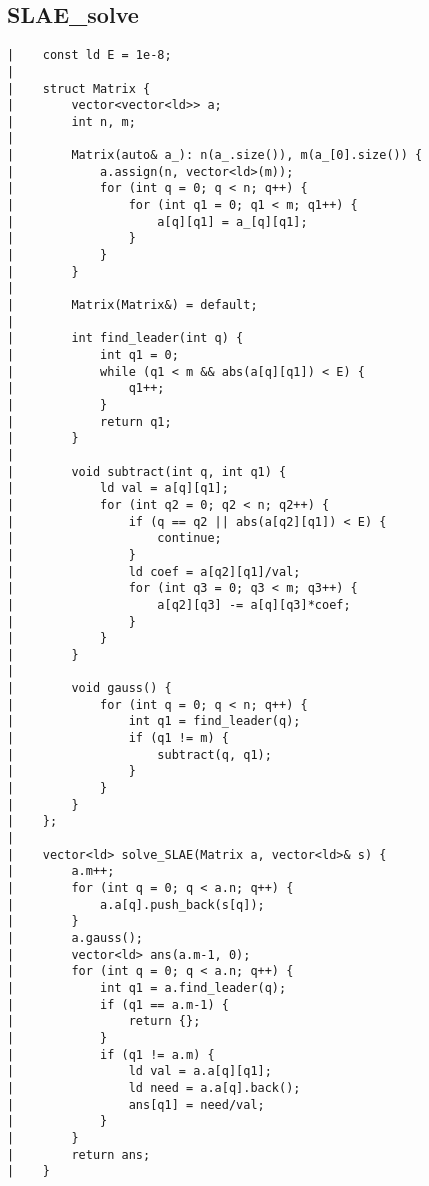 \documentclass[a4paper, 10pt]{article}
\begin{document}
\begin{center}
\section*{SLAE\_solve}
\begin{verbatim}
|    const ld E = 1e-8;
|    
|    struct Matrix {
|        vector<vector<ld>> a;
|        int n, m;
|    
|        Matrix(auto& a_): n(a_.size()), m(a_[0].size()) {
|            a.assign(n, vector<ld>(m));
|            for (int q = 0; q < n; q++) {
|                for (int q1 = 0; q1 < m; q1++) {
|                    a[q][q1] = a_[q][q1];
|                }
|            }
|        }
|    
|        Matrix(Matrix&) = default;
|    
|        int find_leader(int q) {
|            int q1 = 0;
|            while (q1 < m && abs(a[q][q1]) < E) {
|                q1++;
|            }
|            return q1;
|        }
|    
|        void subtract(int q, int q1) {
|            ld val = a[q][q1];
|            for (int q2 = 0; q2 < n; q2++) {
|                if (q == q2 || abs(a[q2][q1]) < E) {
|                    continue;
|                }
|                ld coef = a[q2][q1]/val;
|                for (int q3 = 0; q3 < m; q3++) {
|                    a[q2][q3] -= a[q][q3]*coef;
|                }
|            }
|        }
|    
|        void gauss() {
|            for (int q = 0; q < n; q++) {
|                int q1 = find_leader(q);
|                if (q1 != m) {
|                    subtract(q, q1);
|                }
|            }
|        }
|    };
|    
|    vector<ld> solve_SLAE(Matrix a, vector<ld>& s) {
|        a.m++;
|        for (int q = 0; q < a.n; q++) {
|            a.a[q].push_back(s[q]);
|        }
|        a.gauss();
|        vector<ld> ans(a.m-1, 0);
|        for (int q = 0; q < a.n; q++) {
|            int q1 = a.find_leader(q);
|            if (q1 == a.m-1) {
|                return {};
|            }
|            if (q1 != a.m) {
|                ld val = a.a[q][q1];
|                ld need = a.a[q].back();
|                ans[q1] = need/val;
|            }
|        }
|        return ans;
|    }
\end{verbatim}


\end{center}
\end{document}
